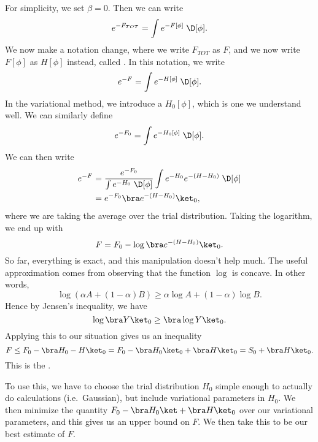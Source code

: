 \documentclass[a4paper]{article}
\begin{document}
For simplicity, we set $\beta = 0$. Then we can write
\[
  e^{-F_{TOT}} = \int e^{-F[\phi]}\;\D [\phi].
\]
We now make a notation change, where we write $F_{TOT}$ as $F$, and we now write $F[\phi]$ as $H[\phi]$ instead, called . In this notation, we write
\[
  e^{-F} = \int e^{-H[\phi]} \;\D [\phi].
\]
In the variational method, we introduce a  $H_0[\phi]$, which is one we understand well. We can similarly define
\[
  e^{-F_0} = \int e^{-H_0[\phi]} \;\D [\phi].
\]
We can then write
\begin{align*}
  e^{-F} &= \frac{e^{-F_0}}{\int e^{-H_0}\;\D [\phi]} \int e^{-H_0} e^{-(H - H_0)}\;\D [\phi] \\
  &= e^{-F_0} \bra e^{-(H - H_0)} \ket_0,
\end{align*}
where we are taking the average over the trial distribution. Taking the logarithm, we end up with
\[
  F = F_0 - \log \bra e^{-(H - H_0)}\ket_0.
\]
So far, everything is exact, and this manipulation doesn't help much. The useful approximation comes from observing that the function $\log$ is concave. In other words,
\[
  \log (\alpha A + (1 - \alpha) B) \geq \alpha \log A + (1 - \alpha) \log B.
\]
Hence by Jensen's inequality, we have
\[
  \log \bra Y \ket_0 \geq \bra \log Y \ket_0.
\]
Applying this to our situation gives us an inequality
\[
  F \leq F_0 - \bra H_0 - H\ket_0 = F_0 - \bra H_0\ket_0 + \bra H\ket_0 = S_0 + \bra H\ket_0.
\]
This is the .

To use this, we have to choose the trial distribution $H_0$ simple enough to actually do calculations (i.e.\ Gaussian), but include variational parameters in $H_0$. We then minimize the quantity $F_0 - \bra H_0\ket + \bra H\ket_0$ over our variational parameters, and this gives us an upper bound on $F$. We then take this to be our best estimate of $F$.
\end{document}
